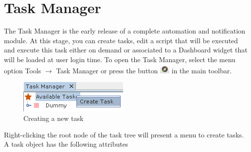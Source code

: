 \documentclass[a4paper]{article}
\begin{document}
	\newpage
	\section{Task Manager} \label{sec:task_manager}
		The Task Manager is the early release of a complete automation and notification module. At this stage, you can create tasks, edit a script that will be executed and execute this task either on demand or associated to a Dashboard widget that will be loaded at user login time. To open the Task Manager, select the menu option Tools $\rightarrow$ Task Manager or press the button \includegraphics[width=0.5cm]{img/icon_task_manager.png} in the main toolbar.
		\begin{figure}[h!]
			\centering
			\includegraphics[width=0.3\linewidth]{img/task_manager_create_task.png}
			\caption{Creating a new task}
			\label{fig:task_manager_create_task}
		\end{figure}
		Right-clicking the root node of the task tree will present a menu to create tasks. A task object has the following attributes
\end{document}
